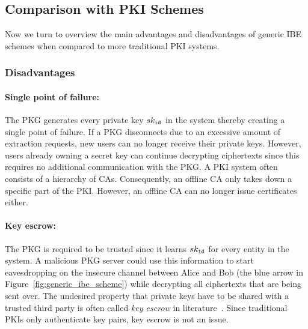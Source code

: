 \subsection{Comparison with PKI Schemes}
\label{sec:pros_and_cons_of_ibe}
Now we turn to overview the main advantages and disadvantages of generic IBE schemes when compared to more traditional PKI systems.

\subsubsection{Disadvantages}
\paragraph{Single point of failure:}
The PKG generates every private key $sk_{\mathtt{id}_{}}$ in the system thereby creating a single point of failure. If a PKG disconnects due to an excessive amount of extraction requests, new users can no longer receive their private keys. However, users already owning a secret key can continue decrypting ciphertexts since this requires no additional communication with the PKG. A PKI system often consists of a hierarchy of CAs. Consequently, an offline CA only takes down a specific part of the PKI. However, an offline CA can no longer issue certificates either.

\paragraph{Key escrow:}
The PKG is required to be trusted since it learns $sk_{\mathtt{id}_{}}$ for every entity in the system. A malicious PKG server could use this information to start eavesdropping on the insecure channel between Alice and Bob (the blue arrow in Figure~\ref{fig:generic_ibe_scheme}) while decrypting all ciphertexts that are being sent over. The undesired property that private keys have to be shared with a trusted third party is often called \textit{key escrow} in literature~\cite{art:AbelsonHARBMBJBMDWGJNGRLSISB97}. Since traditional PKIs only authenticate key pairs, key escrow is not an issue.

